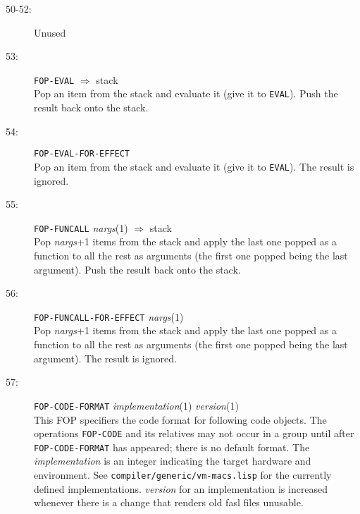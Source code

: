 \begin{description}
\item[50-52:] Unused

\item[53:] \hspace{2em} {\tt FOP-EVAL} \hspace{2em} $\Rightarrow$ \hspace{2em} stack \\
Pop an item from the stack and evaluate it (give it to {\tt EVAL}).
Push the result back onto the stack.

\item[54:] \hspace{2em} {\tt FOP-EVAL-FOR-EFFECT} \\
Pop an item from the stack and evaluate it (give it to {\tt EVAL}).
The result is ignored.

\item[55:] \hspace{2em} {\tt FOP-FUNCALL} \hspace{2em} {\it nargs}(1) \hspace{2em} $\Rightarrow$ \hspace{2em} stack \\
Pop {\it nargs}+1 items from the stack and apply the last one popped
as a function to
all the rest as arguments (the first one popped being the last argument).
Push the result back onto the stack.

\item[56:] \hspace{2em} {\tt FOP-FUNCALL-FOR-EFFECT} \hspace{2em} {\it nargs}(1) \\
Pop {\it nargs}+1 items from the stack and apply the last one popped
as a function to
all the rest as arguments (the first one popped being the last argument).
The result is ignored.

\item[57:] \hspace{2em} {\tt FOP-CODE-FORMAT} \hspace{2em} {\it implementation}(1)
\hspace{2em} {\it version}(1) \\
This FOP specifiers the code format for following code objects.  The operations
{\tt FOP-CODE} and its relatives may not occur in a group until after {\tt
FOP-CODE-FORMAT} has appeared; there is no default format.  The {\it
implementation} is an integer indicating the target hardware and environment.
See {\tt compiler/generic/vm-macs.lisp} for the currently defined
implementations.  {\it version} for an implementation is increased whenever
there is a change that renders old fasl files unusable.


\end{description}
